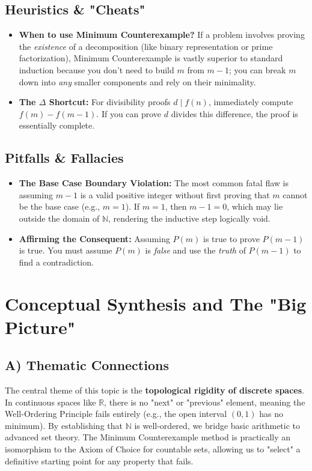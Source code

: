 \documentclass[11pt, a4paper]{article}
\theoremstyle{definition}
\theoremstyle{remark}
\newcommand{\R}{\mathbb{R}}
\newcommand{\N}{\mathbb{N}}
\begin{document}
\subsection{Heuristics \& "Cheats"}
\begin{itemize}
    \item \textbf{When to use Minimum Counterexample?} If a problem involves proving the \textit{existence} of a decomposition (like binary representation or prime factorization), Minimum Counterexample is vastly superior to standard induction because you don't need to build $m$ from $m-1$; you can break $m$ down into \textit{any} smaller components and rely on their minimality.
    \item \textbf{The $\Delta$ Shortcut:} For divisibility proofs $d \mid f(n)$, immediately compute $f(m) - f(m-1)$. If you can prove $d$ divides this difference, the proof is essentially complete.
\end{itemize}

\subsection{Pitfalls \& Fallacies}
\begin{itemize}
    \item \textbf{The Base Case Boundary Violation:} The most common fatal flaw is assuming $m-1$ is a valid positive integer without first proving that $m$ cannot be the base case (e.g., $m=1$). If $m=1$, then $m-1=0$, which may lie outside the domain of $\N$, rendering the inductive step logically void.
    \item \textbf{Affirming the Consequent:} Assuming $P(m)$ is true to prove $P(m-1)$ is true. You must assume $P(m)$ is \textit{false} and use the \textit{truth} of $P(m-1)$ to find a contradiction.
\end{itemize}

\newpage
\section{Conceptual Synthesis and The "Big Picture"}

\subsection{A) Thematic Connections}
The central theme of this topic is the \textbf{topological rigidity of discrete spaces}. In continuous spaces like $\R$, there is no "next" or "previous" element, meaning the Well-Ordering Principle fails entirely (e.g., the open interval $(0,1)$ has no minimum). By establishing that $\N$ is well-ordered, we bridge basic arithmetic to advanced set theory. The Minimum Counterexample method is practically an isomorphism to the Axiom of Choice for countable sets, allowing us to "select" a definitive starting point for any property that fails.
\end{document}
